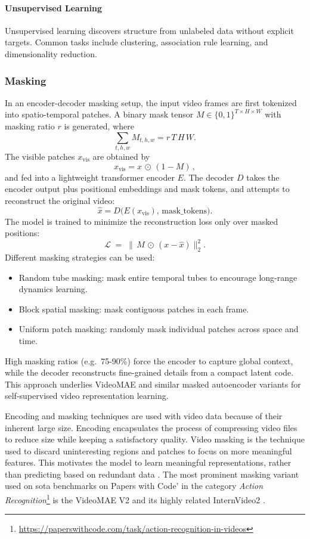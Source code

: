\paragraph{Unsupervised Learning}
Unsupervised learning discovers structure from unlabeled data without explicit targets. Common tasks include clustering, association rule learning, and dimensionality reduction. 

\subsubsection{Masking}

In an encoder-decoder masking setup, the input video frames are first tokenized into spatio-temporal patches. A binary mask tensor \(M\in\{0,1\}^{T\times H\times W}\) with masking ratio \(r\) is generated, where
\[
\sum_{t,h,w} M_{t,h,w} = r\,T\,H\,W.
\]
The visible patches \(x_\text{vis}\) are obtained by
\[
x_\text{vis} = x \,\odot\,(1 - M)\,,
\]
and fed into a lightweight transformer encoder \(E\). The decoder \(D\) takes the encoder output plus positional embeddings and mask tokens, and attempts to reconstruct the original video:
\[
\hat{x} = D\bigl(E(x_\text{vis}),\,\text{mask\_tokens}\bigr).
\]
The model is trained to minimize the reconstruction loss only over masked positions:
\[
\mathcal{L} \;=\; \bigl\lVert\,M \,\odot\,(x - \hat{x})\bigr\rVert_2^2.
\]
Different masking strategies can be used:
\begin{itemize}
    \item Random tube masking: mask entire temporal tubes to encourage long-range dynamics learning.
    \item Block spatial masking: mask contiguous patches in each frame.
    \item Uniform patch masking: randomly mask individual patches across space and time.
\end{itemize}
High masking ratios (e.g.\ 75-90\%) force the encoder to capture global context, while the decoder reconstructs fine-grained details from a compact latent code. This approach underlies VideoMAE and similar masked autoencoder variants for self-supervised video representation learning.


Encoding and masking techniques are used with video data because of their inherent large size. Encoding encapsulates the process of compressing video files to reduce size while keeping a satisfactory quality. Video masking is the technique used to discard uninteresting regions and patches to focus on more meaningful features. This motivates the model to learn meaningful representations, rather than predicting based on redundant data \cite{tong_videomae_2022}. The most prominent masking variant used on \acrshort{sota} benchmarks on Papers with Code' in the category \textit{Action Recognition}\footnote{\url{https://paperswithcode.com/task/action-recognition-in-videos}} is the VideoMAE V2 \cite{wang_videomae_2023} and its highly related InternVideo2 \cite{wang_internvideo2_2024}. 

